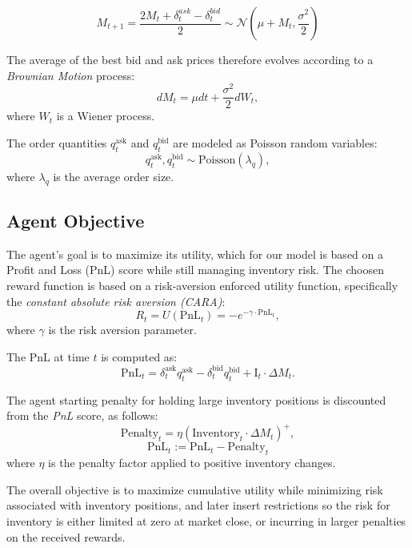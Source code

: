 $$
M_{t+1} = \frac{2M_t + \delta^{ask}_{t} - \delta^{bid}_{t}}{2} 
\sim \mathcal{N}(\mu + M_{t}, \frac{\sigma^2}{2})
$$

The average of the best bid and ask prices therefore evolves according to a \textit{Brownian Motion} process:
$$
dM_t = \mu dt + \frac{\sigma^2}{2} dW_t,
$$
where \( W_t \) is a Wiener process.

The order quantities \( q_t^{\text{ask}} \) and \( q_t^{\text{bid}} \) are modeled as Poisson random variables:
$$
q_t^{\text{ask}}, q_t^{\text{bid}} \sim \text{Poisson}(\lambda_q),
$$
where \( \lambda_q \) is the average order size.

\subsection{Agent Objective}
The agent’s goal is to maximize its utility, which for our model is based on a Profit and Loss (PnL) score while still managing inventory risk. The choosen reward function is based on a risk-aversion enforced utility function, specifically the \textit{constant absolute risk aversion (CARA)}:
$$
R_t = U(\text{PnL}_t) = -e^{-\gamma \cdot \text{PnL}_t},
$$
where \( \gamma \) is the risk aversion parameter.

The PnL at time \( t \) is computed as:
$$
\text{PnL}_t = \delta_t^{\text{ask}} q_t^{\text{ask}} - \delta_t^{\text{bid}} q_t^{\text{bid}} + \text{I}_t \cdot \Delta M_t.
$$

The agent starting penalty for holding large inventory positions  is discounted from the \textit{PnL} score, as follows:
$$
\text{Penalty}_t = \eta \left( \text{Inventory}_t \cdot \Delta M_t \right)^+,
$$
$$
\text{PnL}_t := \text{PnL}_t - \text{Penalty}_t
$$
where \( \eta \) is the penalty factor applied to positive inventory changes.

The overall objective is to maximize cumulative utility while minimizing risk associated with inventory positions, and later insert restrictions so the risk for inventory is either limited at zero at market close, or incurring in larger penalties on the received rewards.